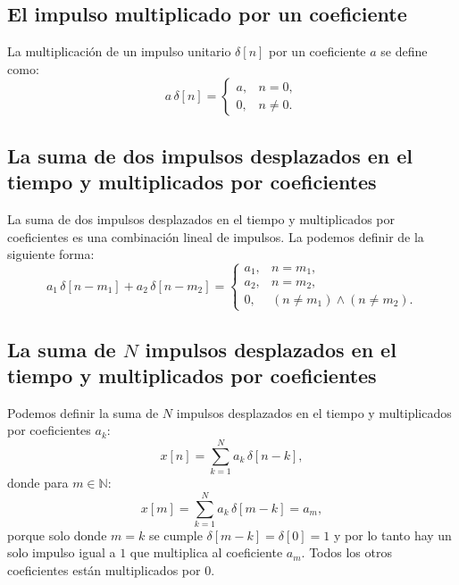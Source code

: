 \subsection{El impulso multiplicado por un coeficiente}

La multiplicación de un impulso unitario $\delta[n]$ por un
coeficiente $a$ se define como:
\begin{equation}
	a \, \delta[n] = 
	\begin{cases}
		a, & n = 0, \\
		0, & n \neq 0.
	\end{cases}
\end{equation}

\subsection{La suma de dos impulsos desplazados en el tiempo y multiplicados por coeficientes}

La suma de dos impulsos desplazados en el tiempo y multiplicados por
coeficientes es una combinación lineal de impulsos. La podemos
definir de la siguiente forma:
\begin{equation}
	a_{1} \, \delta[n - m_{1}] + a_{2} \, \delta[n - m_{2}] = 
	\begin{cases}
		a_{1}, & n = m_{1}, \\
		a_{2}, & n = m_{2}, \\
		0, & (n \neq m_{1}) \wedge (n \neq m_{2}).
	\end{cases}
\end{equation}

\subsection{La suma de $N$ impulsos desplazados en el tiempo y multiplicados por coeficientes}

Podemos definir la suma de $N$ impulsos desplazados en el tiempo y multiplicados por
coeficientes $a_{k}$:
\begin{equation}
	x[n] = \sum_{k = 1}^{N} a_{k} \, \delta[n - k],
\end{equation}
donde para $m \in \mathbb{N}$:
\begin{equation}
	x[m] = \sum_{k = 1}^{N} a_{k} \, \delta[m - k] = a_{m},
\end{equation}
porque solo donde $m = k$ se cumple $\delta[m - k] = \delta[0] = 1$ y por lo tanto hay un solo impulso igual a $1$ que multiplica al coeficiente $a_{m}$. Todos los otros coeficientes están multiplicados por $0$.

